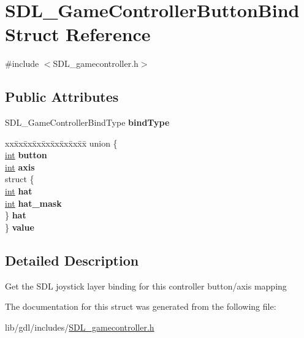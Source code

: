\hypertarget{struct_s_d_l___game_controller_button_bind}{}\section{S\+D\+L\+\_\+\+Game\+Controller\+Button\+Bind Struct Reference}
\label{struct_s_d_l___game_controller_button_bind}


{\ttfamily \#include $<$S\+D\+L\+\_\+gamecontroller.\+h$>$}

\subsection*{Public Attributes}
\begin{DoxyCompactItemize}
\item 
\hypertarget{struct_s_d_l___game_controller_button_bind_a032fd941b0e8e5e2cdf52b7597f559b9}{}S\+D\+L\+\_\+\+Game\+Controller\+Bind\+Type {\bfseries bind\+Type}\label{struct_s_d_l___game_controller_button_bind_a032fd941b0e8e5e2cdf52b7597f559b9}

\item 
\hypertarget{struct_s_d_l___game_controller_button_bind_a56380e643eeffe873f2a6ca0acaae62c}{}\begin{tabbing}
xx\=xx\=xx\=xx\=xx\=xx\=xx\=xx\=xx\=\kill
union \{\\
\>\hyperlink{_s_d_l__thread_8h_a6a64f9be4433e4de6e2f2f548cf3c08e}{int} {\bfseries button}\\
\>\hyperlink{_s_d_l__thread_8h_a6a64f9be4433e4de6e2f2f548cf3c08e}{int} {\bfseries axis}\\
\>struct \{\\
\>\>\hyperlink{_s_d_l__thread_8h_a6a64f9be4433e4de6e2f2f548cf3c08e}{int} {\bfseries hat}\\
\>\>\hyperlink{_s_d_l__thread_8h_a6a64f9be4433e4de6e2f2f548cf3c08e}{int} {\bfseries hat\_mask}\\
\>\} {\bfseries hat}\\
\} {\bfseries value}\label{struct_s_d_l___game_controller_button_bind_a56380e643eeffe873f2a6ca0acaae62c}
\\

\end{tabbing}\end{DoxyCompactItemize}


\subsection{Detailed Description}
Get the S\+D\+L joystick layer binding for this controller button/axis mapping 

The documentation for this struct was generated from the following file\+:\begin{DoxyCompactItemize}
\item 
lib/gdl/includes/\hyperlink{_s_d_l__gamecontroller_8h}{S\+D\+L\+\_\+gamecontroller.\+h}\end{DoxyCompactItemize}
